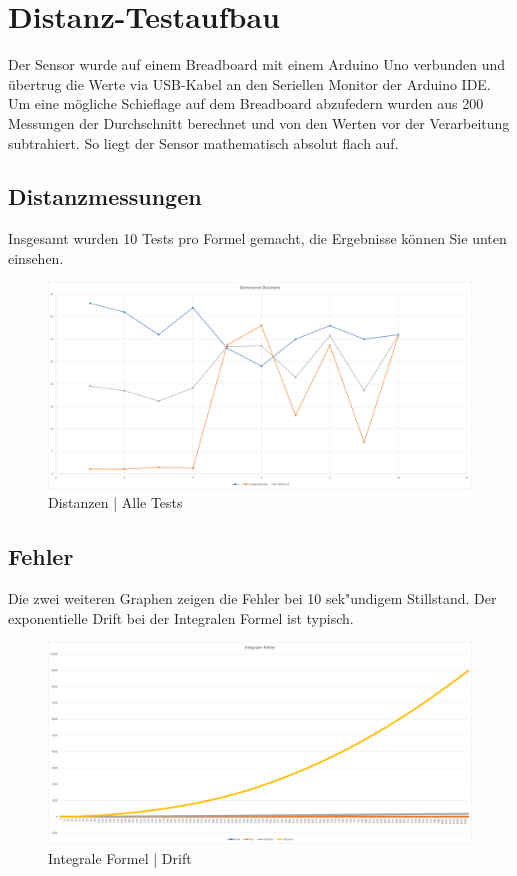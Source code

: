 \section{Distanz-Testaufbau}
Der Sensor wurde auf einem Breadboard mit einem Arduino Uno verbunden und übertrug die Werte
via USB-Kabel an den Seriellen Monitor der Arduino IDE. Um eine mögliche Schieflage auf dem
Breadboard abzufedern wurden aus 200 Messungen der Durchschnitt berechnet und von den Werten vor
der Verarbeitung subtrahiert. So liegt der Sensor mathematisch absolut flach auf. \\

\subsection{Distanzmessungen}
Insgesamt wurden 10 Tests pro Formel gemacht, die Ergebnisse können Sie unten einsehen.\\

\begin{figure} [h]
    \centering
    \includegraphics[width = 15cm]{Bilder/_DistanzVergleich}
    \caption{Distanzen | Alle Tests}
    \end{figure}

\subsection{Fehler}
Die zwei weiteren Graphen zeigen die Fehler bei 10 sek"undigem Stillstand. Der exponentielle Drift 
bei der Integralen Formel ist typisch. 

\begin{figure} [h]
    \centering
    \includegraphics[width = 15cm]{Bilder/_integralDistance001}
    \caption{Integrale Formel | Drift}
    \end{figure}


